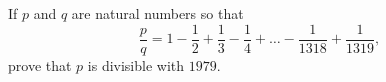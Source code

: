 If $p$ and $q$ are natural numbers so that \[ \frac{p}{q}=1-\frac{1}{2}+\frac{1}{3}-\frac{1}{4}+ \ldots -\frac{1}{1318}+\frac{1}{1319}, \] prove that $p$ is divisible with $1979$.